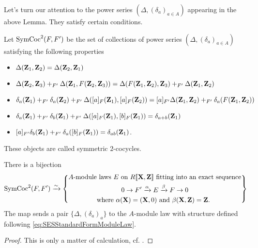 \documentclass[../main.tex]{subfiles}
\begin{document}
Let's turn our attention to the power series $(\Delta, (\delta_a)_{a\in A})$
appearing in the above Lemma. They satisfy certain conditions.
\begin{defi}%
  Let $\operatorname{SymCoc}^2(F, F')$ be the set of collections of power series $(\Delta,
  (\delta_a)_{a \in A})$ satisfying the following properties
  \begin{itemize}
    \item $\Delta(\mathbf{Z}_1,\mathbf{Z}_2) = \Delta(\mathbf{Z}_2,\mathbf{Z}_1)$
    \item $\Delta(\mathbf{Z}_2,\mathbf{Z}_3) +_{F'} \Delta(\mathbf{Z}_1, F(\mathbf{Z}_2,\mathbf{Z}_3)) =
      \Delta(F(\mathbf{Z}_1,\mathbf{Z}_2), \mathbf{Z}_3) +_{F'} \Delta(\mathbf{Z}_1,\mathbf{Z}_2)$
    \item $\delta_a(\mathbf{Z}_1) +_{F'} \delta_a(\mathbf{Z}_2) +_{F'} \Delta([a]_F(\mathbf{Z}_1),
      [a]_F(\mathbf{Z}_2)) = 
      [a]_{F'}\Delta(\mathbf{Z}_1,\mathbf{Z}_2) +_{F'} \delta_a(F(\mathbf{Z}_1,\mathbf{Z}_2))$
    \item $\delta_a(\mathbf{Z}_1) +_{F'} \delta_b(\mathbf{Z}_1) +_{F'} \Delta([a]_F(\mathbf{Z}_1),
      [b]_F(\mathbf{Z}_1)) =
      \delta_{a+b}(\mathbf{Z}_1)$
    \item $[a]_{F'}\delta_b(\mathbf{Z}_1) +_{F'} \delta_a([b]_F(\mathbf{Z}_1)) = \delta_{ab}(\mathbf{Z}_1)$.
  \end{itemize}
  These objects are called symmetric $2$-cocycles. 
\end{defi}
\begin{prop}%
  There is a bijection 
  \begin{equation*}
    \operatorname{SymCoc}^2(F, F') \xrightarrow{\sim} \left\{
      \begin{gathered}
        \text{$A$-module laws $E$ on $R\llbracket \mathbf{X}, \mathbf{Z} \rrbracket$ fitting into an
        exact sequence}
        \\ 0 \to F' \xrightarrow{\alpha} E \xrightarrow{\beta} F \to 0 \\
        \text{where $\alpha(\mathbf{X}) = (\mathbf{X}, 0)$ and $\beta(\mathbf{X}, \mathbf{Z}) = \mathbf{Z}$. }
      \end{gathered}
      \right\}
  \end{equation*}
  The map sends a pair $\{\Delta, (\delta_a)_a\}$ to the $A$-module law with
  structure defined following \eqref{eq:SESStandardFormModuleLaw}. 
  \begin{proof}[Proof]
    This is only a matter of calculation, cf. \cite[Section
    6]{hopkins1994equivariant}.
  \end{proof}
\end{prop}
\end{document}
